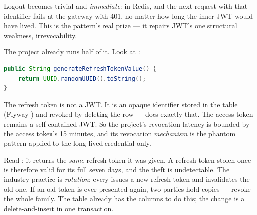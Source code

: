Logout becomes trivial and \emph{immediate}:  in Redis,
and the next request with that identifier fails at the gateway with 401,
no matter how long the inner JWT would have lived. This is the pattern's
real prize --- it repairs JWT's one structural weakness, irrevocability.

The project already runs half of it. Look at
:

\begin{lstlisting}[language=Java]
public String generateRefreshTokenValue() {
    return UUID.randomUUID().toString();
}
\end{lstlisting}

The refresh token is not a JWT. It is an opaque identifier stored in the
 table (Flyway ) and revoked by deleting
the row ---  does exactly that. The access token
remains a self-contained JWT. So the project's revocation latency is
bounded by the access token's 15 minutes, and its revocation
\emph{mechanism} is the phantom pattern applied to the long-lived
credential only.

\begin{pitfall}
Read : it returns the \emph{same} refresh
token it was given. A refresh token stolen once is therefore valid for
its full seven days, and the theft is undetectable. The industry
practice is \emph{rotation}: every  issues a new refresh
token and invalidates the old one. If an old token is ever presented
again, two parties hold copies --- revoke the whole family. The table
already has the columns to do this; the change is a delete-and-insert in
one transaction.
\end{pitfall}

